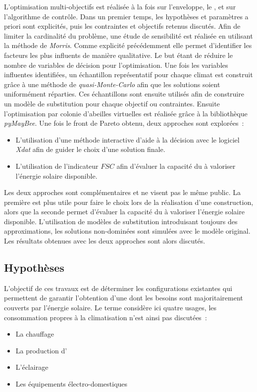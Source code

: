 L’optimisation multi-objectifs est réalisée à la fois sur l’enveloppe, le ,
et sur l’algorithme de contrôle. Dans un premier temps, les hypothèses
et paramètres a priori sont explicités, puis les contraintes et objectifs retenus
discutés. Afin de limiter la
cardinalité du problème, une étude de sensibilité est réalisée en utilisant la méthode de
\textit{Morris}. Comme explicité précédemment elle permet d’identifier les facteurs les
plus influents de manière qualitative. Le but étant de réduire le nombre de variables de
décision pour l’optimisation. Une fois les variables influentes
identifiées, un échantillon représentatif pour chaque climat est construit grâce à une
méthode de \textit{quasi-Monte-Carlo} afin que les solutions soient uniformément réparties.
Ces échantillons sont ensuite utilisés afin de construire un modèle de substitution pour chaque objectif ou
contraintes. Ensuite l’optimisation par colonie d’abeilles virtuelles est réalisée
grâce à la bibliothèque \textit{pyMayBee}.
Une fois le front de Pareto obtenu, deux approches sont explorées~:
\begin{itemize}
  \item L’utilisation d’une méthode interactive d’aide à la décision avec le
        logiciel \textit{Xdat} afin de guider le choix d’une solution finale.
  \item L’utilisation de l’indicateur $FSC$ afin d’évaluer la capacité du 
        à valoriser l’énergie solaire disponible.
\end{itemize}
Les deux approches sont complémentaires et ne visent pas le même public. La première
est plus utile pour faire le choix lors de la réalisation d’une construction, alors que
la seconde permet d’évaluer la capacité du  à valoriser l’énergie solaire
disponible.
L’utilisation de modèles de substitution introduisant toujours des approximations,
les solutions non-dominées sont simulées avec le modèle original. Les résultats obtenues
avec les deux approches sont alors discutés.



\subsection{Hypothèses} %
\label{sub:hypotheses}
L’objectif de ces travaux est de déterminer les configurations existantes qui permettent
de garantir l’obtention d’une  dont les besoins sont majoritairement couverts
par l’énergie solaire. Le terme  considère ici quatre usages, les consommation
propres à la climatisation n’est ainsi pas discutées~:
\begin{itemize}
  \item La chauffage
  \item La production d’
  \item L’éclairage
  \item Les équipements électro-domestiques
\end{itemize}



